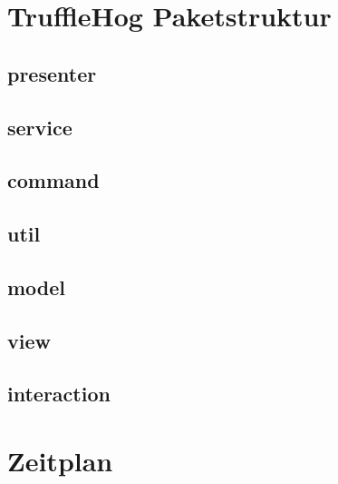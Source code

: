 \documentclass[18pt]{beamer}
\begin{document}
\section{TruffleHog Paketstruktur}
	
	\subsection{presenter}
		
	\subsection{service}
		
	\subsection{command}
		
	\subsection{util}
		
	\subsection{model}
		
		
	\subsection{view}
		
	\subsection{interaction}
		

\section{Zeitplan}

\appendix
\beginbackup
\backupend
\end{document}
